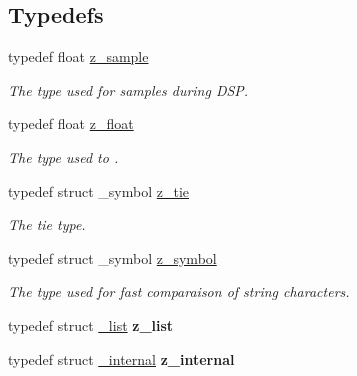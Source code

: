 \subsection*{Typedefs}
\begin{DoxyCompactItemize}
\item 
\hypertarget{group__zpd_gab051b2e32a9e98865a95c0c9d84c50e5}{typedef float \hyperlink{group__zpd_gab051b2e32a9e98865a95c0c9d84c50e5}{z\-\_\-sample}}\label{group__zpd_gab051b2e32a9e98865a95c0c9d84c50e5}

\begin{DoxyCompactList}\small\item\em The type used for samples during D\-S\-P. \end{DoxyCompactList}\item 
\hypertarget{group__zpd_ga86e16508ee69192343f6f6ad26fcef55}{typedef float \hyperlink{group__zpd_ga86e16508ee69192343f6f6ad26fcef55}{z\-\_\-float}}\label{group__zpd_ga86e16508ee69192343f6f6ad26fcef55}

\begin{DoxyCompactList}\small\item\em The type used to . \end{DoxyCompactList}\item 
\hypertarget{group__zpd_ga36a59f7502bf6b62bab3e65cc08fe08d}{typedef struct \-\_\-symbol \hyperlink{group__zpd_ga36a59f7502bf6b62bab3e65cc08fe08d}{z\-\_\-tie}}\label{group__zpd_ga36a59f7502bf6b62bab3e65cc08fe08d}

\begin{DoxyCompactList}\small\item\em The tie type. \end{DoxyCompactList}\item 
\hypertarget{group__zpd_ga43e609e9bccc7a2018b8f16558b9494c}{typedef struct \-\_\-symbol \hyperlink{group__zpd_ga43e609e9bccc7a2018b8f16558b9494c}{z\-\_\-symbol}}\label{group__zpd_ga43e609e9bccc7a2018b8f16558b9494c}

\begin{DoxyCompactList}\small\item\em The type used for fast comparaison of string characters. \end{DoxyCompactList}\item 
\hypertarget{group__zpd_ga7b4018681e55fc620945913034a58aa8}{typedef struct \hyperlink{struct__list}{\-\_\-list} {\bfseries z\-\_\-list}}\label{group__zpd_ga7b4018681e55fc620945913034a58aa8}

\item 
\hypertarget{group__zpd_gacbec311053bd107cf38672c5572634e2}{typedef struct \hyperlink{struct__internal}{\-\_\-internal} {\bfseries z\-\_\-internal}}\label{group__zpd_gacbec311053bd107cf38672c5572634e2}


\end{DoxyCompactItemize}
